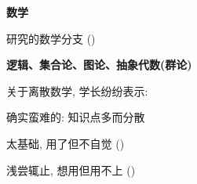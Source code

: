 
\begin{frame}{}
\end{frame}

\begin{frame}{}
  \begin{center}
    {\bf \Large {}数学}

    \pause
    \vspace{0.50cm}
    研究的数学分支 ()
  \end{center}
\end{frame}

\begin{frame}{}
  \begin{center}
    {\bf \large {} 逻辑、集合论、图论、抽象代数(群论)}

    \vspace{0.80cm}
    {}
  \end{center}
\end{frame}

\begin{frame}{}
  \begin{center}
    {\large 关于离散数学, 学长纷纷表示:}

    \vspace{0.80cm}


    \vspace{0.60cm}

  \end{center}
\end{frame}

\begin{frame}{}
  \begin{center}

    \pause
    \vspace{0.80cm}
    {\large 确实蛮难的: 知识点多而分散}
  \end{center}
\end{frame}

\begin{frame}{}
  \begin{center}

    \pause
    \vspace{0.80cm}
    {\large 太基础, 用了但不自觉 ()}

    \vspace{0.50cm}
    {\large 浅尝辄止, 想用但用不上 ()}
  \end{center}
\end{frame}


